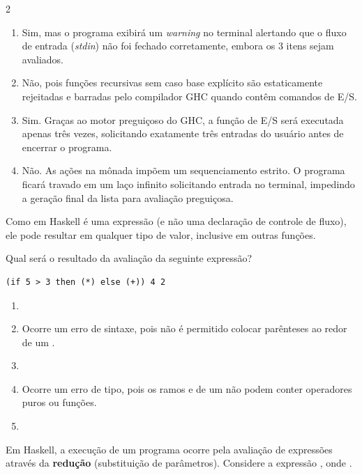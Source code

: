 \documentclass[a4paper,10pt,brazil]{article}
\begin{document}
\begin{multicols}{2}
\begin{enumerate}
  \item Sim, mas o programa exibirá um \emph{warning} no terminal alertando que o fluxo de entrada (\emph{stdin}) não foi fechado corretamente, embora os 3 itens sejam avaliados.

  \item Não, pois funções recursivas sem caso base explícito são estaticamente rejeitadas e barradas pelo compilador GHC quando contêm comandos de E/S.

  \item Sim. Graças ao motor preguiçoso do GHC, a função de E/S será executada apenas três vezes, solicitando exatamente três entradas do usuário antes de encerrar o programa.

  \item Não. As ações na mônada  impõem um sequenciamento estrito. O programa ficará travado em um laço infinito solicitando entrada no terminal, impedindo a geração final da lista para avaliação preguiçosa.


\end{enumerate}

Como  em Haskell é uma expressão (e não uma declaração de controle de fluxo), ele pode resultar em qualquer tipo de valor, inclusive em outras funções. 

Qual será o resultado da avaliação da seguinte expressão?
\begin{verbatim}
(if 5 > 3 then (*) else (+)) 4 2
\end{verbatim}

\begin{enumerate}
  \item {}

  \item Ocorre um erro de sintaxe, pois não é permitido colocar parênteses ao redor de um .

  \item {}

  \item Ocorre um erro de tipo, pois os ramos  e  de um  não podem conter operadores puros ou funções.

  \item {}


\end{enumerate}

Em Haskell, a execução de um programa ocorre pela avaliação de expressões através da \textbf{redução} (substituição de parâmetros). Considere a expressão , onde . 


\end{multicols}
\end{document}
